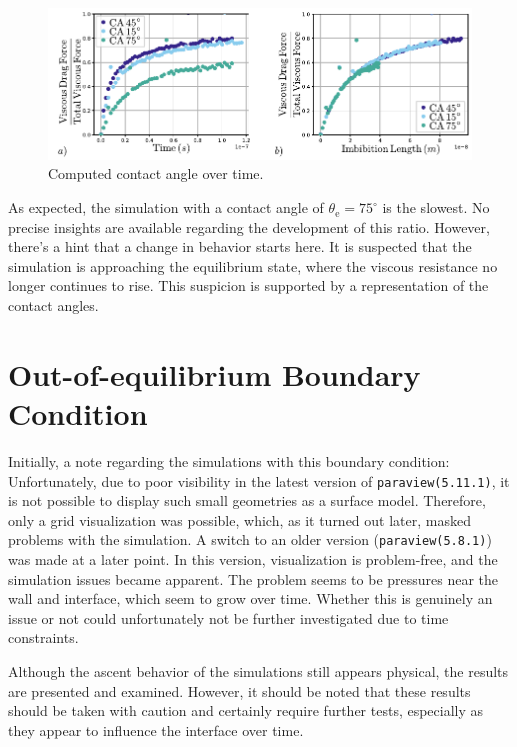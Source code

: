 \begin{figure}[h]
    \centering
    \includegraphics[width=.8\textwidth]{Pictures/CA_Forces_Variation.pdf}
    \caption{Computed contact angle over time.}
    \label{fig: CA_Forces} 
\end{figure}
As expected, the simulation with a contact angle of $\theta_{\mathrm{e}}=75^{\circ}$ is the slowest. No precise insights are available regarding the development of this ratio. However, there's a hint that a change in behavior starts here. It is suspected that the simulation is approaching the equilibrium state, where the viscous resistance no longer continues to rise. This suspicion is supported by a representation of the contact angles. 

\section{Out-of-equilibrium Boundary Condition}
\label{sec: outOfEquilibriumBoundaryCondition}
Initially, a note regarding the simulations with this boundary condition: Unfortunately, due to poor visibility in the latest version of \texttt{paraview(5.11.1)}, it is not possible to display such small geometries as a surface model. Therefore, only a grid visualization was possible, which, as it turned out later, masked problems with the simulation. A switch to an older version (\texttt{paraview(5.8.1)}) was made at a later point. In this version, visualization is problem-free, and the simulation issues became apparent. The problem seems to be pressures near the wall and interface, which seem to grow over time. Whether this is genuinely an issue or not could unfortunately not be further investigated due to time constraints.

Although the ascent behavior of the simulations still appears physical, the results are presented and examined. However, it should be noted that these results should be taken with caution and certainly require further tests, especially as they appear to influence the interface over time. 

